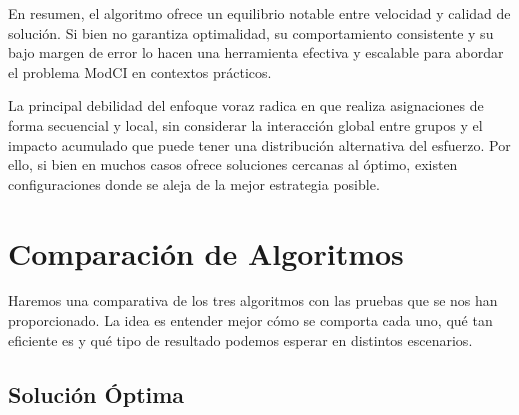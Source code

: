 \documentclass[11pt,letter]{article}
\begin{document}
    En resumen, el algoritmo ofrece un equilibrio notable entre velocidad y calidad de solución. Si bien no garantiza optimalidad, su comportamiento consistente y su bajo margen de error lo hacen una herramienta efectiva y escalable para abordar el problema ModCI en contextos prácticos.
    \begin{tcolorbox}[colback=red!5!white, colframe=red!50!black, title=Advertencia sobre la correctitud]
            La principal debilidad del enfoque voraz radica en que realiza asignaciones de forma secuencial y local, sin considerar la interacción global entre grupos y el impacto acumulado que puede tener una distribución alternativa del esfuerzo. Por ello, si bien en muchos casos ofrece soluciones cercanas al óptimo, existen configuraciones donde se aleja de la mejor estrategia posible.
        \end{tcolorbox}


    \newpage



    \section{Comparación de Algoritmos}

    Haremos una comparativa de los tres algoritmos con las pruebas que se nos han proporcionado. La idea es entender mejor cómo se comporta cada uno, qué tan eficiente es y qué tipo de resultado podemos esperar en distintos escenarios.

    \subsection{Solución Óptima}
\end{document}
